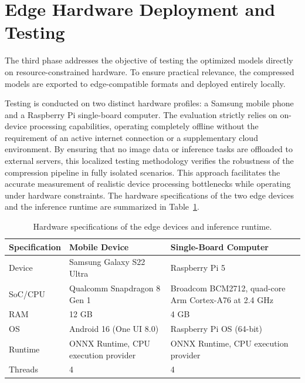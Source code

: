 \section{Edge Hardware Deployment and Testing}
The third phase addresses the objective of testing the optimized models directly on resource-constrained hardware. To ensure practical relevance, the compressed models are exported to edge-compatible formats and deployed entirely locally.

Testing is conducted on two distinct hardware profiles: a Samsung mobile phone and a Raspberry Pi single-board computer. The evaluation strictly relies on on-device processing capabilities, operating completely offline without the requirement of an active internet connection or a supplementary cloud environment. By ensuring that no image data or inference tasks are offloaded to external servers, this localized testing methodology verifies the robustness of the compression pipeline in fully isolated scenarios. This approach facilitates the accurate measurement of realistic device processing bottlenecks while operating under hardware constraints. The hardware specifications of the two edge devices and the inference runtime are summarized in Table~\ref{tab:edge-specs}.

\begin{table}[htbp]
    \centering
    \small
    \begin{tabular}{p{2.6cm}p{4.9cm}p{5.5cm}}
        \toprule
        \textbf{Specification} & \textbf{Mobile Device} & \textbf{Single-Board Computer} \\
        \midrule
        Device & Samsung Galaxy S22 Ultra & Raspberry Pi 5 \\
        SoC/CPU & Qualcomm Snapdragon 8 Gen 1 & Broadcom BCM2712, quad-core Arm Cortex-A76 at 2.4 GHz \\
        RAM & 12 GB & 4 GB \\
        OS & Android 16 (One UI 8.0) & Raspberry Pi OS (64-bit) \\
        Runtime & ONNX Runtime, CPU execution provider & ONNX Runtime, CPU execution provider \\
        Threads & 4 & 4 \\
        \bottomrule
    \end{tabular}
    \caption{Hardware specifications of the edge devices and inference runtime.}
    \label{tab:edge-specs}
\end{table}

